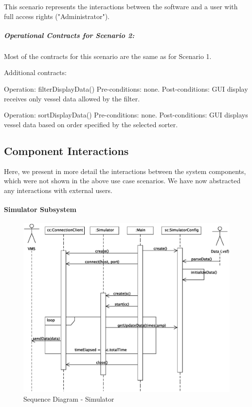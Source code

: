 \documentclass{article}
\begin{document}
This scenario represents the interactions between the software and a user with full access rights ("Administrator").

\subparagraph{Operational Contracts for Scenario 2:}

Most of the contracts for this scenario are the same as for Scenario 1.

Additional contracts:

Operation: filterDisplayData()
Pre-conditions: none.
Post-conditions: GUI display receives only vessel data allowed by the filter.

Operation: sortDisplayData()
Pre-conditions: none.
Post-conditions: GUI displays vessel data based on order specified by the selected sorter.

\subsection{Component Interactions}

Here, we present in more detail the interactions between the system components, which were not shown in the above use case scenarios. We have now abstracted any interactions with external users.

\paragraph{Simulator Subsystem}

\begin{figure}[!htb]
\caption{Sequence Diagram - Simulator}
\centering
\includegraphics[scale=0.6]{diagrams/simulator-sequence-diagram.eps}
\end{figure}
\end{document}
